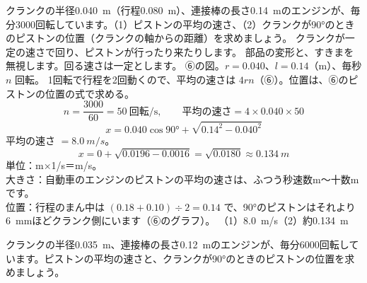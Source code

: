 \begin{phreidai}[エンジンのピストンの速さ]\label{ph:力-7:ex9}
クランクの半径\qty{0.040}{m}（行程\qty{0.080}{m}）、連接棒の長さ\qty{0.14}{m}のエンジンが、毎分3000回転しています。（1）ピストンの平均の速さ、（2）クランクが\ang{90}のときのピストンの位置（クランクの軸からの距離）を求めましょう。
\phbamen
クランクが一定の速さで回り、ピストンが行ったり来たりします。
\phmushi
部品の変形と、すきまを無視します。回る速さは一定とします。
\phzu
⑥の図。$r=0.040$、$l=0.14$（m）、毎秒 $n$ 回転。
\phriyu
1回転で行程を2回動くので、平均の速さは $4rn$（⑥）。位置は、⑥のピストンの位置の式で求める。
\phtateru
\[n=\frac{3000}{60}=50\ \text{回転/s},\qquad \text{平均の速さ}=4\times0.040\times50\]
\[x=0.040\cos\ang{90}+\sqrt{0.14^2-0.040^2}\]
\phtoku
平均の速さ $=\qty{8.0}{m/s}$。
\[x=0+\sqrt{0.0196-0.0016}=\sqrt{0.0180}\approx\qty{0.134}{m}\]
\phtashikame
単位：m×1/s＝m/s。\\
大きさ：自動車のエンジンのピストンの平均の速さは、ふつう秒速数m〜十数mです。\\
位置：行程のまん中は $(0.18+0.10)\div2=0.14$ で、\ang{90}のピストンはそれより\qty{6}{mm}ほどクランク側にいます（⑥のグラフ）。
\kotae （1）\qty{8.0}{m/s}\quad（2）約\qty{0.134}{m}
\end{phreidai}
\begin{jibun}
クランクの半径\qty{0.035}{m}、連接棒の長さ\qty{0.12}{m}のエンジンが、毎分6000回転しています。ピストンの平均の速さと、クランクが\ang{90}のときのピストンの位置を求めましょう。
\end{jibun}

